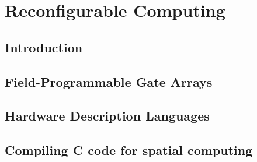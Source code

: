 \chapter{Reconfigurable Computing}
\label{reconfigurableComputing}

\section{Introduction}
\label{reconfigurableComputing:introduction}


\section{Field-Programmable Gate Arrays}
\label{fpga}


\section{Hardware Description Languages}
\label{hdl}


\section{Compiling C code for spatial computing}
\label{cForSpatial}

